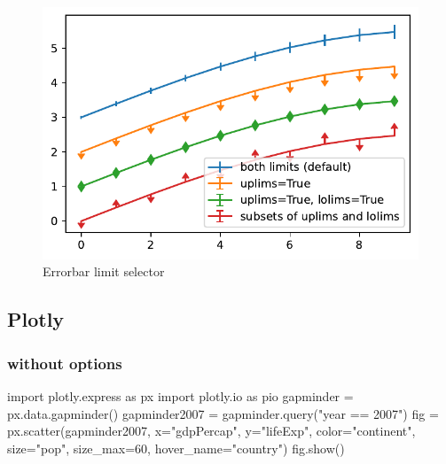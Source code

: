 \documentclass[
  letterpaper,
  DIV=11,
  numbers=noendperiod,
  oneside]{scrartcl}
\newenvironment{Shaded}{\begin{snugshade}}{\end{snugshade}}
\newcommand{\DecValTok}[1]{\textcolor[rgb]{0.68,0.00,0.00}{#1}}
\newcommand{\ImportTok}[1]{\textcolor[rgb]{0.00,0.46,0.62}{#1}}
\newcommand{\NormalTok}[1]{\textcolor[rgb]{0.00,0.23,0.31}{#1}}
\newcommand{\OperatorTok}[1]{\textcolor[rgb]{0.37,0.37,0.37}{#1}}
\newcommand{\StringTok}[1]{\textcolor[rgb]{0.13,0.47,0.30}{#1}}
\begin{document}
\begin{figure}[H]

{\centering \includegraphics{start-with-quarto_files/figure-pdf/fig-limits-eg-output-1.pdf}

}

\caption{\label{fig-limits-eg}Errorbar limit selector}

\end{figure}

\hypertarget{plotly}{%
\subsection{Plotly}\label{plotly}}

\hypertarget{without-options}{%
\subsubsection{without options}\label{without-options}}

\begin{Shaded}
\begin{Highlighting}[]
\ImportTok{import}\NormalTok{ plotly.express }\ImportTok{as}\NormalTok{ px}
\ImportTok{import}\NormalTok{ plotly.io }\ImportTok{as}\NormalTok{ pio}
\NormalTok{gapminder }\OperatorTok{=}\NormalTok{ px.data.gapminder()}
\NormalTok{gapminder2007 }\OperatorTok{=}\NormalTok{ gapminder.query(}\StringTok{"year == 2007"}\NormalTok{)}
\NormalTok{fig }\OperatorTok{=}\NormalTok{ px.scatter(gapminder2007, }
\NormalTok{                 x}\OperatorTok{=}\StringTok{"gdpPercap"}\NormalTok{, y}\OperatorTok{=}\StringTok{"lifeExp"}\NormalTok{, color}\OperatorTok{=}\StringTok{"continent"}\NormalTok{, }
\NormalTok{                 size}\OperatorTok{=}\StringTok{"pop"}\NormalTok{, size\_max}\OperatorTok{=}\DecValTok{60}\NormalTok{,}
\NormalTok{                 hover\_name}\OperatorTok{=}\StringTok{"country"}\NormalTok{)}
\NormalTok{fig.show()}
\end{Highlighting}
\end{Shaded}
\end{document}
